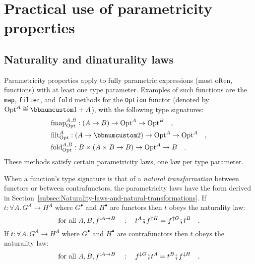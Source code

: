 \section{Practical use of parametricity properties}

\subsection{Naturality and dinaturality laws\label{sec:Naturality-laws-for-fully-parametric-functions} }

Parametricity properties apply to fully parametric expressions (most
often, functions) with at least one type parameter. Examples of such
functions are the \lstinline!map!, \lstinline!filter!, and \lstinline!fold!
methods for the \lstinline!Option! functor (denoted by $\text{Opt}^{A}\triangleq\bbnum 1+A$),
with the following type signatures:
\begin{align*}
 & \text{fmap}_{\text{Opt}}^{A,B}:\left(A\rightarrow B\right)\rightarrow\text{Opt}^{A}\rightarrow\text{Opt}^{B}\quad,\\
 & \text{filt}_{\text{Opt}}^{A}:\left(A\rightarrow\bbnum 2\right)\rightarrow\text{Opt}^{A}\rightarrow\text{Opt}^{A}\quad,\\
 & \text{fold}_{\text{Opt}}^{A,B}:B\times\left(A\times B\rightarrow B\right)\rightarrow\text{Opt}^{A}\rightarrow B\quad.
\end{align*}
These methods satisfy certain parametricity laws, one law per type
parameter.

When a function\textsf{'}s type signature is that of a \emph{natural transformation}
between functors or between contrafunctors, the parametricity laws
have the form derived in Section~\ref{subsec:Naturality-laws-and-natural-transformations}.
If $t:\forall A.\,G^{A}\rightarrow H^{A}$ where $G^{\bullet}$ and
$H^{\bullet}$ are functors then $t$ obeys the naturality law:
\begin{equation}
\text{for all }A,B,f^{:A\rightarrow B}\quad:\quad t^{A}\bef f^{\uparrow H}=f^{\uparrow G}\bef t^{B}\quad.\label{eq:naturality-law-for-functors}
\end{equation}
If $t:\forall A.\,G^{A}\rightarrow H^{A}$ where $G^{\bullet}$ and
$H^{\bullet}$ are contrafunctors then $t$ obeys the naturality law:
\begin{equation}
\text{for all }A,B,f^{:A\rightarrow B}\quad:\quad f^{\downarrow G}\bef t^{A}=t^{B}\bef f^{\downarrow H}\quad.\label{eq:naturality-law-for-contrafunctors}
\end{equation}

